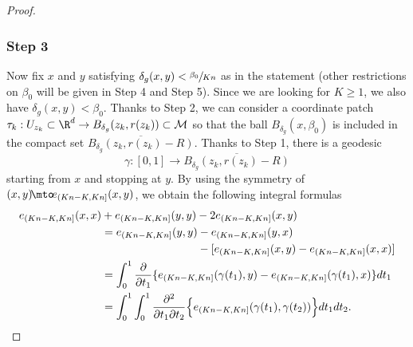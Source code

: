\begin{proof}
\subsubsection*{Step 3} Now fix $x$ and $y$ satisfying $\delta_g(x,y)< \sfrac{\beta_0}{Kn}$ as in the statement (other restrictions on $\beta_0$ will be given in Step 4 and Step 5).
Since we are looking for $K\geq 1$, we also have $\delta_g(x,y)<\beta_0$.
Thanks to Step 2, we can consider a coordinate patch $\tau_{k}:U_{z_k}\subset \R^d\to B_{\delta_g}(z_k,r(z_k))\subset \mathcal{M}$ so that the ball $B_{\delta_g}(x,\beta_0)$ is included in the compact set
$\overline{B_{\delta_g}(z_k,r(z_k)-R)}$.
Thanks to Step 1, there is a geodesic
\[
\gamma:[0,1]\to \overline{B_{\delta_g}(z_k,r(z_k)-R)}
\]
starting from $x$ and stopping at $y$.
By using the symmetry of $(x,y)\!\mto\! e_{(Kn-K,Kn]}(x,y)$, we obtain the following integral formulas
\begin{equation}\label{doubl}
\begin{aligned}
e_{(Kn-K,Kn]}(x,x)&+e_{(Kn-K,Kn]}(y,y)-2e_{(Kn-K,Kn]}(x,y) \\
& = e_{(Kn-K,Kn]}(y,y)-e_{(Kn-K,Kn]}(y,x)\\
&\hspace*{3.03cm}
-[e_{(Kn-K,Kn]}(x,y)-e_{(Kn-K,Kn]}(x,x)] \\
& = \int_{0}^1 \frac{\partial }{\partial t_1}\{ e_{(Kn-K,Kn]} (\gamma(t_1),y)-e_{(Kn-K,Kn]} (\gamma(t_1),x)\} dt_1 \\ 
& = \int_{0}^1 \int_{0}^1 \frac{\partial^2 }{\partial t_1 \partial t_2}\Bigl\{ e_{(Kn-K,Kn]}(\gamma(t_1),\gamma(t_2))\Bigr\} dt_1 dt_2.
\end{aligned}
\end{equation}


\end{proof}
